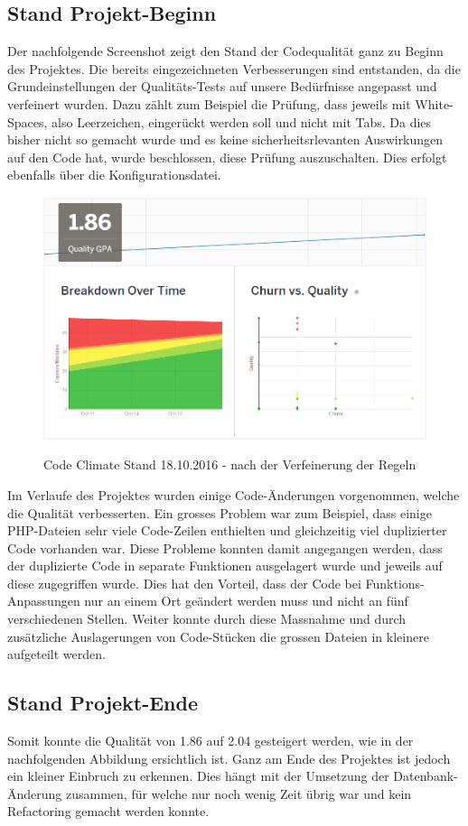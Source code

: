 \subsection{Stand Projekt-Beginn}
Der nachfolgende Screenshot zeigt den Stand der Codequalität ganz zu Beginn des Projektes. Die bereits eingezeichneten Verbesserungen sind entstanden, da die Grundeinstellungen der Qualitäts-Tests auf unsere Bedürfnisse angepasst und verfeinert wurden. Dazu zählt zum Beispiel die Prüfung, dass jeweils mit White-Spaces, also Leerzeichen, eingerückt werden soll und nicht mit Tabs. Da dies bisher nicht so gemacht wurde und es keine sicherheitsrlevanten Auswirkungen auf den Code hat, wurde beschlossen, diese Prüfung auszuschalten. Dies erfolgt ebenfalls über die Konfigurationsdatei.

\begin{figure}[H]
	\centering
	\includegraphics[width=.7\textwidth]{Images/CodeClimate_Beginn.PNG}
	\caption{Code Climate Stand 18.10.2016 - nach der Verfeinerung der Regeln}
	\cite{codeclimate.com}
\end{figure}

Im Verlaufe des Projektes wurden einige Code-Änderungen vorgenommen, welche die Qualität verbesserten. Ein grosses Problem war zum Beispiel, dass einige PHP-Dateien sehr viele Code-Zeilen enthielten und gleichzeitig viel duplizierter Code vorhanden war. Diese Probleme konnten damit angegangen werden, dass der duplizierte Code in separate Funktionen ausgelagert wurde und jeweils auf diese zugegriffen wurde. Dies hat den Vorteil, dass der Code bei Funktions-Anpassungen nur an einem Ort geändert werden muss und nicht an fünf verschiedenen Stellen. Weiter konnte durch diese Massnahme und durch zusätzliche Auslagerungen von Code-Stücken die grossen Dateien in kleinere aufgeteilt werden. \\

\subsection{Stand Projekt-Ende}
Somit konnte die Qualität von 1.86 auf 2.04 gesteigert werden, wie in der nachfolgenden Abbildung ersichtlich ist. Ganz am Ende des Projektes ist jedoch ein kleiner Einbruch zu erkennen. Dies hängt mit der Umsetzung der Datenbank-Änderung zusammen, für welche nur noch wenig Zeit übrig war und kein \gls{Refactoring} gemacht werden konnte.

